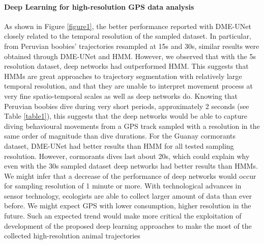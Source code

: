 \documentclass{article}
\begin{document}
\paragraph{Deep Learning for high-resolution GPS data analysis}
As shown in Figure \ref{figure1}, the better performance reported with DME-UNet closely related to the temporal resolution of the sampled dataset.
In particular, from Peruvian boobies' trajectories resampled at 15s and 30s, similar results were obtained through DME-UNet and HMM. However, we observed that with the 5s resolution dataset, deep networks had outperformed HMM. This suggests that HMMs are great approaches to trajectory segmentation with relatively large temporal resolution, and that they are unable to interpret movement process at very fine spatio-temporal scales as well as deep networks do. Knowing that Peruvian boobies dive during very short periods, approximately 2 seconds (see Table \ref{table1}), this suggests that the deep networks would be able to capture diving behavioural movements from a GPS track sampled with a resolution in the same order of magnitude than dive durations.
For the Guanay cormorants dataset, DME-UNet had better results than HMM for all tested sampling resolution. However, cormorants dives last about 20s, which could explain why even with the 30s sampled dataset deep networks had better results than HMMs. We might infer that a decrease of the performance of deep networks would occur for sampling resolution of 1 minute or more.
With technological advances in sensor technology, ecologists are able to collect larger amount of data than ever before. We might expect GPS with lower consumption, higher resolution in the future. Such an expected trend would make more critical the exploitation of development of the proposed deep learning approaches to make the most of the collected high-resolution  animal trajectories   \citep{beyan_setting_2020,malde_machine_2020, yoda_advances_2019}
\end{document}
